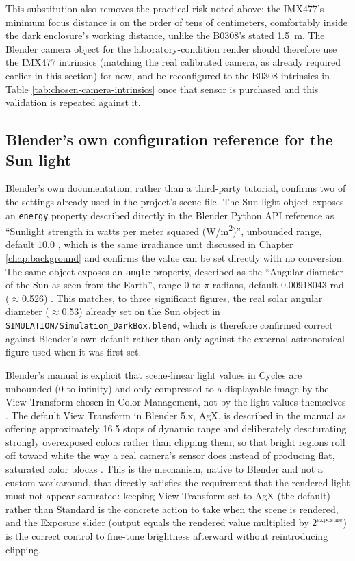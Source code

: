 This substitution also removes the practical risk noted above: the IMX477's minimum focus distance is on the order of tens of centimeters, comfortably inside the dark enclosure's working distance, unlike the B0308's stated 1.5~m. The Blender camera object for the laboratory-condition render should therefore use the IMX477 intrinsics (matching the real calibrated camera, as already required earlier in this section) for now, and be reconfigured to the B0308 intrinsics in Table \ref{tab:chosen-camera-intrinsics} once that sensor is purchased and this validation is repeated against it.

\subsection{Blender's own configuration reference for the Sun light}

Blender's own documentation, rather than a third-party tutorial, confirms two of the settings already used in the project's scene file. The Sun light object exposes an \texttt{energy} property described directly in the Blender Python API reference as ``Sunlight strength in watts per meter squared (W/m\textsuperscript{2})'', unbounded range, default 10.0 \cite{blender_sunlight_api}, which is the same irradiance unit discussed in Chapter \ref{chap:background} and confirms the value can be set directly with no conversion. The same object exposes an \texttt{angle} property, described as the ``Angular diameter of the Sun as seen from the Earth'', range 0 to $\pi$ radians, default 0.00918043 rad ($\approx$0.526\textdegree) \cite{blender_sunlight_api}. This matches, to three significant figures, the real solar angular diameter ($\approx$0.53\textdegree) already set on the Sun object in \texttt{SIMULATION/Simulation\_DarkBox.blend}, which is therefore confirmed correct against Blender's own default rather than only against the external astronomical figure used when it was first set.

Blender's manual is explicit that scene-linear light values in Cycles are unbounded (0 to infinity) and only compressed to a displayable image by the View Transform chosen in Color Management, not by the light values themselves \cite{blender_color_management}. The default View Transform in Blender 5.x, AgX, is described in the manual as offering approximately 16.5 stops of dynamic range and deliberately desaturating strongly overexposed colors rather than clipping them, so that bright regions roll off toward white the way a real camera's sensor does instead of producing flat, saturated color blocks \cite{blender_color_management}. This is the mechanism, native to Blender and not a custom workaround, that directly satisfies the requirement that the rendered light must not appear saturated: keeping View Transform set to AgX (the default) rather than Standard is the concrete action to take when the scene is rendered, and the Exposure slider (output equals the rendered value multiplied by $2^{\text{exposure}}$) is the correct control to fine-tune brightness afterward without reintroducing clipping.

